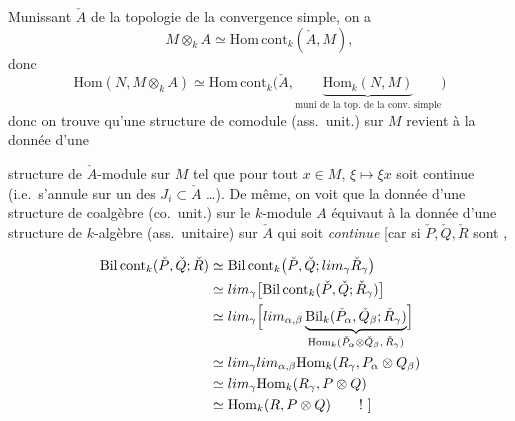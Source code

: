 \documentclass[11pt,a4paper]{article}
\begin{document}
  Munissant $\check{A}$ de la topologie de la convergence simple, on a
\[
  M \otimes_k A \simeq \mathrm{Hom\,cont}_k(\check{A}, M),
\]
donc
\[
  \mathrm{Hom}(N, M \otimes_k A) \simeq \mathrm{Hom\,cont}_k\bigl(\check{A}, \underbrace{\mathrm{Hom}_k(N, M)}_{\text{muni de la top.\ de la conv.\ simple}}\bigr)
\]
donc on trouve qu'une structure de comodule (ass.\ unit.) sur $M$ revient à la donnée d'une

structure de $\check{A}$-module sur $M$ tel que pour tout $x \in M$, $\xi \mapsto \xi x$ soit continue (i.e.\ s'annule sur un des $J_i \subset \check{A}$ …). De même, on voit que la donnée d'une structure de coalgèbre (co.\ unit.) sur le $k$-module $A$ \ill{} équivaut à la donnée d'une  structure de $k$-algèbre (ass.\ unitaire) sur $\check{A}$ qui soit \emph{continue}
[car si $\check{P}, \check{Q}, \check{R}$ sont \ill{} \ill{}, 

\begin{align*}
  \mathrm{Bil\,cont}_k(\check{P}, \check{Q}; \check{R})
  &\simeq \mathrm{Bil\,cont}_k\bigl(\check{P}, \check{Q}; \varprojlim_{\gamma} \check{R}_\gamma\bigr) \\
  &\simeq \varprojlim_{\gamma} \bigl[\mathrm{Bil\,cont}_k(\check{P}, \check{Q}; \check{R}_\gamma)\bigr] \\
  &\simeq \varprojlim_{\gamma} \Bigl[\varinjlim_{\alpha,\beta} \underbrace{\mathrm{Bil}_k(\check{P}_\alpha, \check{Q}_\beta; \check{R}_\gamma)}_{\mathrm{Hom}_k(\check{P}_\alpha \otimes \check{Q}_\beta,\, \check{R}_\gamma)}\Bigr] \\
  &\simeq \varprojlim_{\gamma} \varinjlim_{\alpha,\beta} \mathrm{Hom}_k(R_\gamma, P_\alpha \otimes Q_\beta) \\
  &\simeq \varprojlim_{\gamma} \mathrm{Hom}_k(R_\gamma, P \otimes Q) \\
  &\simeq \mathrm{Hom}_k(R, P \otimes Q) \qquad !\ ]
\end{align*}
\end{document}
